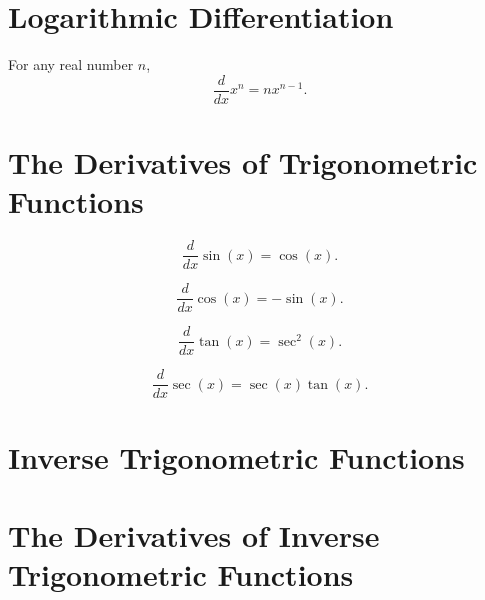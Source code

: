 \documentclass{ximera}
\newcommand{\ddx}{\frac{d}{dx}}
\begin{document}
\section{Logarithmic Differentiation}





\begin{theorem}
For any real number $n$,
\[
\ddx x^n = n x^{n-1}.
\]
\end{theorem}








\section{The Derivatives of Trigonometric Functions}





\begin{theorem}\label{theorem:deriv sin}
\[
\ddx \sin(x) = \cos(x).
\]
\end{theorem}



\begin{theorem}
\[
\ddx \cos(x) = -\sin(x).
\]
\end{theorem}



\begin{theorem}
\[
\ddx \tan(x) = \sec^2(x).
\]
\end{theorem}



\begin{theorem}
\[
\ddx \sec(x) = \sec(x)\tan(x).
\]
\end{theorem}






\section{Inverse Trigonometric Functions}







\section{The Derivatives of Inverse Trigonometric Functions}
\end{document}
